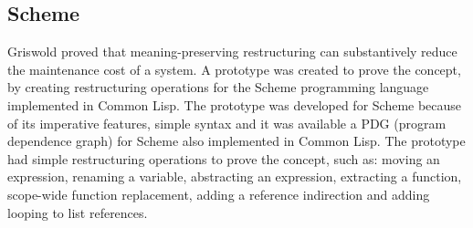 





\subsection{Scheme}

Griswold \cite{griswold1991program} proved that meaning-preserving restructuring can substantively reduce the maintenance cost of a system.
A prototype was created to prove the concept, by creating restructuring operations for the Scheme programming language implemented in Common Lisp.
The prototype was developed for Scheme because of its imperative features, simple syntax and it was available a PDG (program dependence graph) for Scheme also implemented in Common Lisp.
The prototype had simple restructuring operations to prove the concept, such as: moving an expression, renaming a variable, abstracting an expression, extracting a function, scope-wide function replacement, adding a reference indirection and adding looping to list references.

